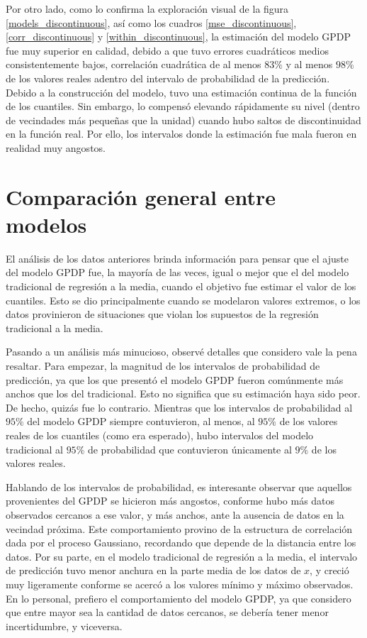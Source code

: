 Por otro lado, como lo confirma la exploraci\'on visual de la figura \ref{models_discontinuous}, as\'i como los cuadros \ref{mse_discontinuous}, \ref{corr_discontinuous} y \ref{within_discontinuous}, la estimaci\'on del modelo GPDP fue muy superior en calidad, debido a que tuvo errores cuadr\'aticos medios consistentemente bajos, correlaci\'on cuadr\'atica de al menos $83\%$ y al menos $98\%$ de los valores reales adentro del intervalo de probabilidad de la predicci\'on. Debido a la construcci\'on del modelo, tuvo una estimaci\'on continua de la funci\'on de los cuantiles. Sin embargo, lo compens\'o elevando r\'apidamente su nivel (dentro de vecindades m\'as pequeñas que la unidad) cuando hubo saltos de discontinuidad en la funci\'on real. Por ello, los intervalos donde la estimaci\'on fue mala fueron en realidad muy angostos.

\section{Comparaci\'on general entre modelos}
\label{models_comp}

El an\'alisis de los datos anteriores brinda informaci\'on para pensar que el ajuste del modelo GPDP fue, la mayor\'ia de las veces, igual o mejor que el del modelo tradicional de regresi\'on a la media, cuando el objetivo fue estimar el valor de los cuantiles. Esto se dio principalmente cuando se modelaron valores extremos, o los datos provinieron de situaciones que violan los supuestos de la regresi\'on tradicional a la media. 

Pasando a un an\'alisis m\'as minucioso, observ\'e detalles que considero vale la pena resaltar. Para empezar, la magnitud de los intervalos de probabilidad de predicci\'on, ya que los que present\'o el modelo GPDP fueron com\'unmente m\'as anchos que los del tradicional. Esto no significa que su estimaci\'on haya sido peor. De hecho, quiz\'as fue lo contrario. Mientras que los intervalos de probabilidad al $95\%$ del modelo GPDP siempre contuvieron, al menos, al $95\%$ de los valores reales de los cuantiles (como era esperado), hubo intervalos del modelo tradicional al $95\%$ de probabilidad que contuvieron \'unicamente al $9\%$ de los valores reales.

Hablando de los intervalos de probabilidad, es interesante observar que aquellos provenientes del GPDP se hicieron m\'as angostos, conforme hubo m\'as datos observados cercanos a ese valor, y m\'as anchos, ante la ausencia de datos en la vecindad pr\'oxima. Este comportamiento provino de la estructura de correlaci\'on dada por el proceso Gaussiano, recordando que depende de la distancia entre los datos. Por su parte, en el modelo tradicional de regresi\'on a la media, el intervalo de predicci\'on tuvo menor anchura en la parte media de los datos de $x$, y creci\'o muy ligeramente conforme se acerc\'o a los valores m\'inimo y m\'aximo observados. En lo personal, prefiero el comportamiento del modelo GPDP, ya que considero que entre mayor sea la cantidad de datos cercanos, se deber\'ia tener menor incertidumbre, y viceversa.

